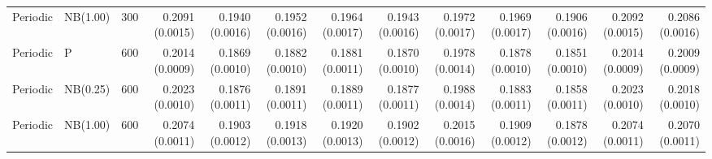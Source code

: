 \begin{table}[p]
{\begin{tabular}{lllrrrrrrrrrr}
Periodic & NB(1.00) & 300
& 0.2091 (0.0015)
& 0.1940 (0.0016)
& 0.1952 (0.0016)
& 0.1964 (0.0017)
& 0.1943 (0.0016)
& 0.1972 (0.0017)
& 0.1969 (0.0017)
& 0.1906 (0.0016)
& 0.2092 (0.0015)
& 0.2086 (0.0016) \\

Periodic & P & 600
& 0.2014 (0.0009)
& 0.1869 (0.0010)
& 0.1882 (0.0010)
& 0.1881 (0.0011)
& 0.1870 (0.0010)
& 0.1978 (0.0014)
& 0.1878 (0.0010)
& 0.1851 (0.0010)
& 0.2014 (0.0009)
& 0.2009 (0.0009) \\

Periodic & NB(0.25) & 600
& 0.2023 (0.0010)
& 0.1876 (0.0011)
& 0.1891 (0.0011)
& 0.1889 (0.0011)
& 0.1877 (0.0011)
& 0.1988 (0.0014)
& 0.1883 (0.0011)
& 0.1858 (0.0011)
& 0.2023 (0.0010)
& 0.2018 (0.0010) \\

Periodic & NB(1.00) & 600
& 0.2074 (0.0011)
& 0.1903 (0.0012)
& 0.1918 (0.0013)
& 0.1920 (0.0013)
& 0.1902 (0.0012)
& 0.2015 (0.0016)
& 0.1909 (0.0012)
& 0.1878 (0.0012)
& 0.2074 (0.0011)
& 0.2070 (0.0011) \\

\hline
\end{tabular}%
}
\end{table}


